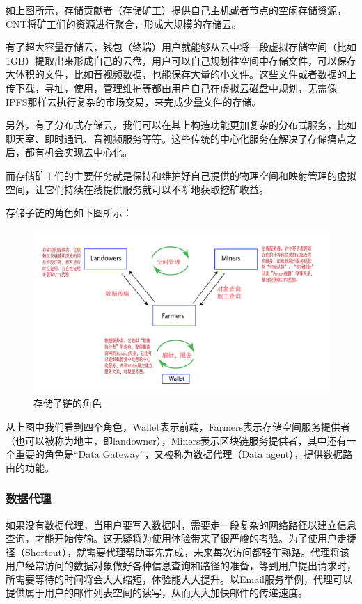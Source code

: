 \documentclass[a4paper,12pt]{article}
\begin{document}
如上图所示，存储贡献者（存储矿工）提供自己主机或者节点的空闲存储资源，CNT将矿工们的资源进行聚合，形成大规模的存储云。

有了超大容量存储云，钱包（终端）用户就能够从云中将一段虚拟存储空间（比如1GB）提取出来形成自己的云盘，用户可以自己规划往空间中存储文件，可以保存大体积的文件，比如音视频数据，也能保存大量的小文件。这些文件或者数据的上传下载，寻址，使用，管理维护等都由用户自己在虚拟云磁盘中规划，无需像IPFS那样去执行复杂的市场交易，来完成少量文件的存储。

另外，有了分布式存储云，我们可以在其上构造功能更加复杂的分布式服务，比如聊天室、即时通讯、音视频服务等等。这些传统的中心化服务在解决了存储痛点之后，都有机会实现去中心化。

而存储矿工们的主要任务就是保持和维护好自己提供的物理空间和映射管理的虚拟空间，让它们持续在线提供服务就可以不断地获取挖矿收益。

存储子链的角色如下图所示：

\begin {figure} [htbp]
\centering \includegraphics [width = 5in] {pic_cn/framework_storage.png}
\caption {存储子链的角色} \label {fig: d0}
\end {figure}

从上图中我们看到四个角色，Wallet表示前端，Farmers表示存储空间服务提供者（也可以被称为地主，即landowner），Miners表示区块链服务提供者，其中还有一个重要的角色是“Data Gateway”，又被称为数据代理（Data agent），提供数据路由的功能。

\subsubsection{数据代理}

如果没有数据代理，当用户要写入数据时，需要走一段复杂的网络路径以建立信息查询，才能开始传输。这无疑将为使用体验带来了很严峻的考验。为了使用户走捷径（Shortcut），就需要代理帮助事先完成，未来每次访问都轻车熟路。代理将该用户经常访问的数据对象做好各种信息查询和路径的准备，等到用户提出请求时，所需要等待的时间将会大大缩短，体验能大大提升。以Email服务举例，代理可以提供属于用户的邮件列表空间的读写，从而大大加快邮件的传递速度。
\end{document}
